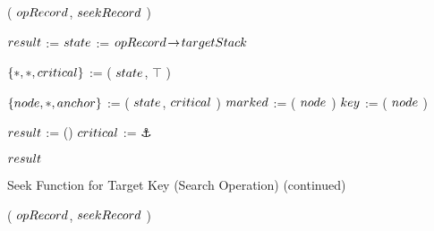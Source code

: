 \begin{limitscope}
\begin{algorithm}[tb]
{{	  }	
		
		\OptReturn[\False]
		\label{lin:local-traverse|tree:end}
}
\BlankLine
\DontPrintSemicolon
\Boolean \ExamineStack( $opRecord$, $seekRecord$ )\;
\PrintSemicolon
\label{lin:local-examine|stack:begin}
\Begin
{
  
   $result$ := \False\;
	 $state$ := $opRecord \!\rightarrow\! targetStack$\;
	 
	 \BlankLine
	
	 $\{  \ast, \ast, critical  \}$ := \GetFullEntry( $state$, $\top$ )\;
	 \label{lin:local-examine|stack:start}	
			
	 \BlankLine
			
			
	 \While{\True}
	 {
	    \label{lin:local-examine|stack:while:begin}
	    $\{  node, \ast, anchor  \}$ := \GetFullEntry( $state$, $critical$ )\;
		  $\nMarked$ := \IsMarked( $node$ )\; 
			$\nKey$ := \GetKey( $node$ )\;
					
			\uIf{$\opRecord \rarrow \key$ = $\nKey$}
			{  
			   \label{lin:local-examine|stack:while:found:begin}
			   $result$ := \True\;
				 \Break\;
				 \label{lin:local-examine|stack:while:found:end}
			} \uElseIf{($\opRecord \rarrow \key$ $<$ $\nKey$) \LOr \LNot($\nMarked$)}
			{
			   \label{lin:local-examine|stack:while:not|found:begin}
			   \Break\;
				 \label{lin:local-examine|stack:while:not|found:end}
			} \Else()
			{			
			   \label{lin:local-examine|stack:while:continue:begin}
			   $critical$ := $\anchor$\;
				 \label{lin:local-examine|stack:while:continue:end}
			}
		  \label{lin:local-examine|stack:while:end} 
   }
	
	 
	 \Return $result$\;
	 \label{lin:local-examine|stack:end}	
}
\end{algorithm}

\begin{algorithm}[tb]
\caption{Seek Function for Target Key (Search Operation) (continued)} 
\label{algo:local-seek:search:2}
\DefineKeyWords
\DontPrintSemicolon
\Boolean \SeekForSearch( $opRecord$, $seekRecord$ )\;
\PrintSemicolon
\label{lin:local-seek|search:begin}
\Begin
{
   
}
\end{algorithm}
\end{limitscope}
